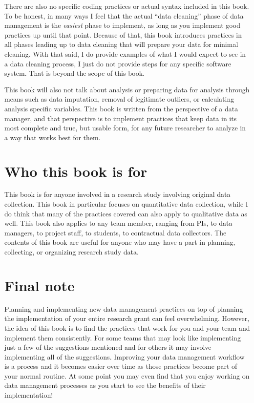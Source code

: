 \documentclass[
]{book}
\begin{document}
There are also no specific coding practices or actual syntax included in this book. To be honest, in many ways I feel that the actual ``data cleaning'' phase of data management is the \emph{easiest} phase to implement, as long as you implement good practices up until that point. Because of that, this book introduces practices in all phases leading up to data cleaning that will prepare your data for minimal cleaning. With that said, I do provide examples of what I would expect to see in a data cleaning process, I just do not provide steps for any specific software system. That is beyond the scope of this book.

This book will also not talk about analysis or preparing data for analysis through means such as data imputation, removal of legitimate outliers, or calculating analysis specific variables. This book is written from the perspective of a data manager, and that perspective is to implement practices that keep data in its most complete and true, but usable form, for any future researcher to analyze in a way that works best for them.

\hypertarget{who-this-book-is-for}{%
\section{Who this book is for}\label{who-this-book-is-for}}

This book is for anyone involved in a research study involving original data collection. This book in particular focuses on quantitative data collection, while I do think that many of the practices covered can also apply to qualitative data as well. This book also applies to any team member, ranging from PIs, to data managers, to project staff, to students, to contractual data collectors. The contents of this book are useful for anyone who may have a part in planning, collecting, or organizing research study data.

\hypertarget{final-note}{%
\section{Final note}\label{final-note}}

Planning and implementing new data management practices on top of planning the implementation of your entire research grant can feel overwhelming. However, the idea of this book is to find the practices that work for you and your team and implement them consistently. For some teams that may look like implementing just a few of the suggestions mentioned and for others it may involve implementing all of the suggestions. Improving your data management workflow is a process and it becomes easier over time as those practices become part of your normal routine. At some point you may even find that you enjoy working on data management processes as you start to see the benefits of their implementation!
\end{document}
